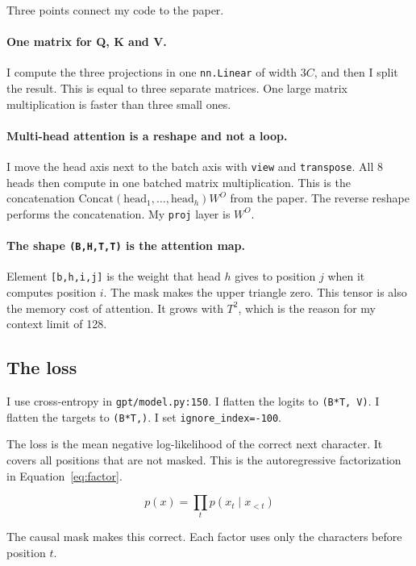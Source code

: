 \documentclass[11pt,a4paper]{article}
\newcommand{\code}[1]{\texttt{#1}}
\begin{document}
Three points connect my code to the paper.

\paragraph{One matrix for Q, K and V.} I compute the three projections in one \code{nn.Linear} of
width $3C$, and then I split the result. This is equal to three separate matrices. One large
matrix multiplication is faster than three small ones.

\paragraph{Multi-head attention is a reshape and not a loop.} I move the head axis next to the
batch axis with \code{view} and \code{transpose}. All 8 heads then compute in one batched matrix
multiplication. This is the concatenation
$\mathrm{Concat}(\mathrm{head}_1,\dots,\mathrm{head}_h)W^{O}$ from the paper. The reverse reshape
performs the concatenation. My \code{proj} layer is $W^{O}$.

\paragraph{The shape \code{(B,H,T,T)} is the attention map.} Element \code{[b,h,i,j]} is the
weight that head $h$ gives to position $j$ when it computes position $i$. The mask makes the upper
triangle zero. This tensor is also the memory cost of attention. It grows with $T^{2}$, which is
the reason for my context limit of 128.

\subsection{The loss}

I use cross-entropy in \code{gpt/model.py:150}. I flatten the logits to \code{(B*T, V)}. I flatten
the targets to \code{(B*T,)}. I set \code{ignore\_index=-100}.

The loss is the mean negative log-likelihood of the correct next character. It covers all
positions that are not masked. This is the autoregressive factorization in
Equation~\ref{eq:factor}.

\begin{equation}
p(x) = \prod_{t} p(x_t \mid x_{<t})
\label{eq:factor}
\end{equation}

The causal mask makes this correct. Each factor uses only the characters before position $t$.
\end{document}
